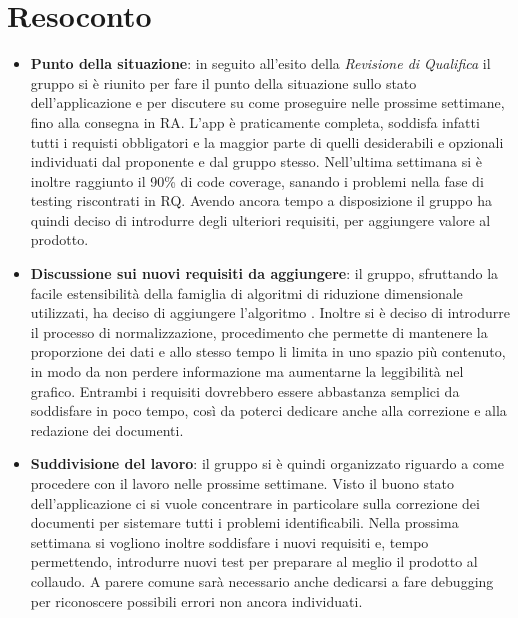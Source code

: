 \section{Resoconto}
\begin{itemize}
	\item \textbf{Punto della situazione}: in seguito all'esito della \textit{Revisione di Qualifica} il gruppo si è riunito per fare il punto della situazione sullo stato dell'applicazione e per discutere su come proseguire nelle prossime settimane, fino alla consegna in RA.
	L'app è praticamente completa, soddisfa infatti tutti i requisti obbligatori e la maggior parte di quelli desiderabili e opzionali individuati dal proponente e dal gruppo stesso. Nell'ultima settimana si è inoltre raggiunto il 90\% di code coverage, sanando i problemi nella fase di testing riscontrati in RQ. 
Avendo ancora tempo a disposizione il gruppo ha quindi deciso di introdurre degli ulteriori requisiti, per aggiungere valore al prodotto. 
	
	\item \textbf{Discussione sui nuovi requisiti da aggiungere}: il gruppo, sfruttando la facile estensibilità della famiglia di algoritmi di riduzione dimensionale utilizzati, ha deciso di aggiungere l'algoritmo . Inoltre si è deciso di introdurre il processo di normalizzazione, procedimento che permette di mantenere la proporzione dei dati e allo stesso tempo li limita in uno spazio più contenuto, in modo da non perdere informazione ma aumentarne la leggibilità nel grafico.
	Entrambi i requisiti dovrebbero essere abbastanza semplici da soddisfare in poco tempo, così da poterci dedicare anche alla correzione e alla redazione dei documenti.
	
	\item \textbf{Suddivisione del lavoro}: il gruppo si è quindi organizzato riguardo a come procedere con il lavoro nelle prossime settimane. Visto il buono stato dell'applicazione ci si vuole concentrare in particolare sulla correzione dei documenti per sistemare tutti i problemi identificabili.
Nella prossima settimana si vogliono inoltre soddisfare i nuovi requisiti e, tempo permettendo, introdurre nuovi test per preparare al meglio il prodotto al collaudo. 
A parere comune sarà necessario anche dedicarsi a fare debugging per riconoscere possibili errori non ancora individuati.
	
\end{itemize}

\newpage